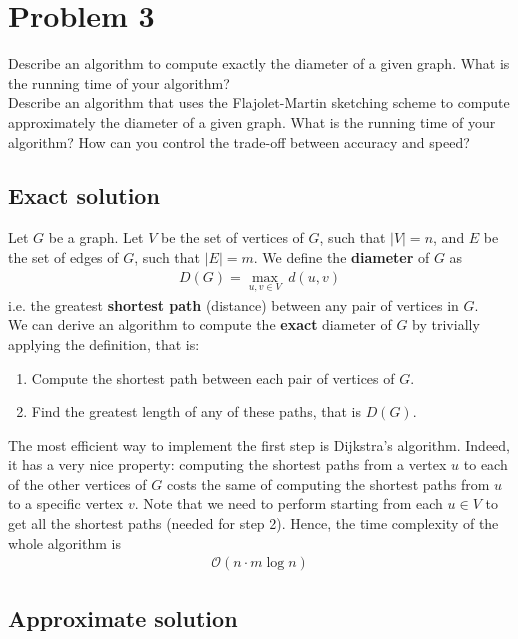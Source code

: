 
\section{Problem 3}

Describe an algorithm to compute exactly the diameter of a given graph. What is the running time of your algorithm?\\
Describe an algorithm that uses the Flajolet-Martin sketching scheme to compute approximately the diameter of a given graph.
What is the running time of your algorithm? How can you control the trade-off between accuracy and speed?

\subsection{Exact solution}

Let $G$ be a graph. Let $V$ be the set of vertices of $G$, such that $|V| = n$, and $E$ be the set of edges of $G$, such that $|E| = m$. We define the \textbf{diameter} of $G$ as
\begin{align*}
D(G) = \max_{u,v \in V} \ d(u,v)
\end{align*}
i.e. the greatest \textbf{shortest path} (distance) between any pair of vertices in $G$.\\
We can derive an algorithm to compute the \textbf{exact} diameter of $G$ by trivially applying the definition, that is:
\begin{enumerate}
	\item Compute the shortest path between each pair of vertices of $G$. 
	\item Find the greatest length of any of these paths, that is $D(G)$.
\end{enumerate}
The most efficient way to implement the first step is Dijkstra's algorithm\cite{dijkstra}. Indeed, it has a very nice
property: computing the shortest paths from a vertex $u$ to each of the other vertices of $G$ costs the same of computing
the shortest paths from $u$ to a specific vertex $v$. Note that we need to perform \cite{dijkstra} starting from each
$u \in V$ to get all the shortest paths (needed for step 2). Hence, the time complexity of the whole algorithm is
\begin{align*}
\mathcal{O}(n \cdot m\log{n})
\end{align*}

\subsection{Approximate solution}

